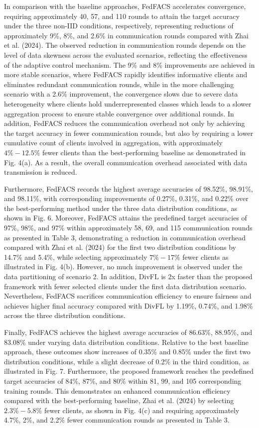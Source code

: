 \documentclass[pdflatex,sn-mathphys-num,oneside]{sn-jnl}%
\theoremstyle{thmstyleone}%
\theoremstyle{thmstyletwo}%
\theoremstyle{thmstylethree}%
\begin{document}
In comparison with the baseline approaches, FedFACS accelerates convergence, requiring approximately 40, 57, and 110 rounds to attain the target accuracy under the three non-IID conditions, respectively, representing reductions of approximately 9\%, 8\%, and 2.6\% in communication rounds compared with Zhai et al. (2024). The observed reduction in communication rounds depends on the level of data skewness across the evaluated scenarios, reflecting the effectiveness of the adaptive control mechanism. The 9\% and 8\% improvements are achieved in more stable scenarios, where FedFACS rapidly identifies informative clients and eliminates redundant communication rounds, while in the more challenging scenario with a 2.6\% improvement, the convergence slows due to severe data heterogeneity where clients hold underrepresented classes which leads to a slower aggregation process to ensure stable convergence over additional rounds. In addition, FedFACS reduces the communication overhead not only by achieving the target accuracy in fewer communication rounds, but also by requiring a lower cumulative count of clients involved in aggregation, with approximately $4\%-12.5\%$ fewer clients than the best-performing baseline as demonstrated in Fig. 4(a). As a result, the overall communication overhead associated with data transmission is reduced. 

Furthermore, FedFACS records the highest average accuracies of 98.52\%, 98.91\%, and 98.11\%, with corresponding improvements of 0.27\%, 0.31\%, and 0.22\% over the best-performing method under the three data distribution conditions, as shown in Fig. 6. Moreover, FedFACS attains the predefined target accuracies of 97\%, 98\%, and 97\% within approximately 58, 69, and 115 communication rounds as presented in Table 3, demonstrating a reduction in communication overhead compared with Zhai et al. (2024) for the first two distribution conditions by 14.7\% and 5.4\%, while selecting approximately $7\%-17\%$ fewer clients as illustrated in Fig. 4(b). However, no much improvement is observed under the data partitioning of scenario 2. In addition, DivFL is 2x faster than the proposed framework with fewer selected clients under the first data distribution scenario. Nevertheless, FedFACS sacrifices communication efficiency to ensure fairness and achieves higher final accuracy compared with DivFL by 1.19\%, 0.74\%, and 1.98\% across the three distribution conditions.



Finally, FedFACS achieves the highest average accuracies of 86.63\%, 88.95\%, and 83.08\% under varying data distribution conditions. Relative to the best baseline approach, these outcomes show increases of 0.35\% and 0.85\% under the first two distribution conditions, while a slight decrease of 0.2\% in the third condition, as illustrated in Fig. 7. Furthermore, the proposed framework reaches the predefined target accuracies of 84\%, 87\%, and 80\% within 81, 99, and 105 corresponding training rounds. This demonstrates an enhanced communication efficiency compared with the best-performing baseline, Zhai et al. (2024) by selecting $2.3\%-5.8\%$ fewer clients, as shown in Fig. 4(c) and requiring approximately 4.7\%, 2\%, and 2.2\% fewer communication rounds as presented in Table 3. 
\end{document}

